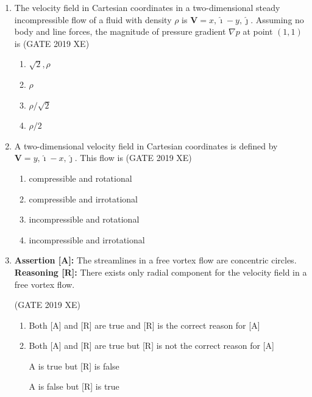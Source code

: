 \documentclass[journal,12pt,onecolumn]{IEEEtran}
\begin{document}
\begin{enumerate}
\item The velocity field in Cartesian coordinates in a two-dimensional steady incompressible flow of a fluid with density $\rho$ is $\mathbf{V} = x,\hat{\imath} - y,\hat{\jmath}$. Assuming no body and line forces, the magnitude of pressure gradient $\nabla p$ at point $(1,1)$ is
\hfill{(GATE 2019 XE)} \\
\begin{multicols}{2}
\begin{enumerate}
\item $\sqrt{2},\rho$
\item $\rho$
\item $\rho/\sqrt{2}$
\item $\rho/2$
\end{enumerate}
\end{multicols}

\newpage

\item A two-dimensional velocity field in Cartesian coordinates is defined by $\mathbf{V} = y,\hat{\imath} - x,\hat{\jmath}$. This flow is
\hfill{(GATE 2019 XE)} \\
\begin{multicols}{2}
\begin{enumerate}
\item compressible and rotational
\item compressible and irrotational
\item incompressible and rotational
\item incompressible and irrotational
\end{enumerate}
\end{multicols}

\item \textbf{Assertion [A]:} The streamlines in a free vortex flow are concentric circles. \\
\textbf{Reasoning [R]:} There exists only radial component for the velocity field in a free vortex flow.

\hfill{(GATE 2019 XE)} \\
\begin{multicols}{2}
\begin{enumerate}
\item Both [A] and [R] are true and [R] is the correct reason for [A]
\item Both [A] and [R] are true but [R] is not the correct reason for [A]
\item [A] is true but [R] is false
\item [A] is false but [R] is true
\end{enumerate}
\end{multicols}


\end{enumerate}
\end{document}
